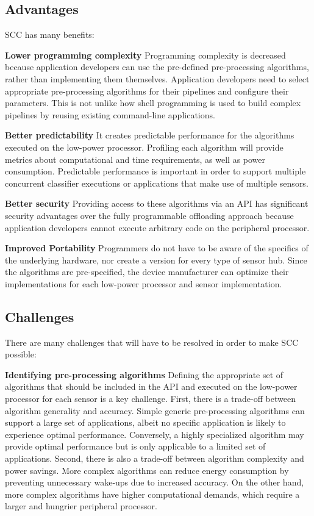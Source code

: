 \subsection{Advantages}

SCC has many benefits:

 {\bf Lower programming complexity}  Programming complexity is
  decreased because application developers can use the pre-defined
  pre-processing algorithms, rather than implementing them themselves. 
  Application developers need to select appropriate pre-processing 
  algorithms for their pipelines and configure their parameters. This 
  is not unlike how shell programming is used to build complex 
  pipelines by reusing existing command-line applications.
  

{\bf Better predictability} It 
  creates predictable performance for the algorithms executed on the
  low-power processor. Profiling each algorithm will provide metrics
  about computational and time requirements, as well as power
  consumption.  Predictable performance is important in order to
  support multiple concurrent classifier executions or applications
  that make use of multiple sensors.


{\bf Better security} Providing access to these algorithms via
  an API has significant security advantages over the fully
  programmable offloading approach because application developers
  cannot execute arbitrary code on the peripheral processor. 


{\bf Improved Portability} Programmers do not have to be
  aware of the specifics of the underlying hardware, nor  create a version
  for every type of sensor hub. Since the algorithms are
  pre-specified, the device manufacturer can optimize their
  implementations for each low-power processor and sensor
  implementation.



\subsection{Challenges}
\label{sec:challenges}

There are many challenges that will have to be resolved in order to
make SCC possible:

{\bf Identifying pre-processing algorithms} Defining the appropriate
set of algorithms that should be included in the API and executed on
the low-power processor for each sensor is a key challenge. First,
there is a trade-off between algorithm generality and accuracy.
Simple generic pre-processing algorithms can support a large set of
applications, albeit no specific application is likely to experience
optimal performance.  Conversely, a highly specialized algorithm may
provide optimal performance but is only applicable to a limited set of
applications.  Second, there is also a trade-off between algorithm
complexity and power savings.  More complex algorithms can reduce
energy consumption by preventing unnecessary wake-ups due to increased
accuracy. On the other hand, more complex algorithms have higher
computational demands, which require a larger and hungrier peripheral
processor.

